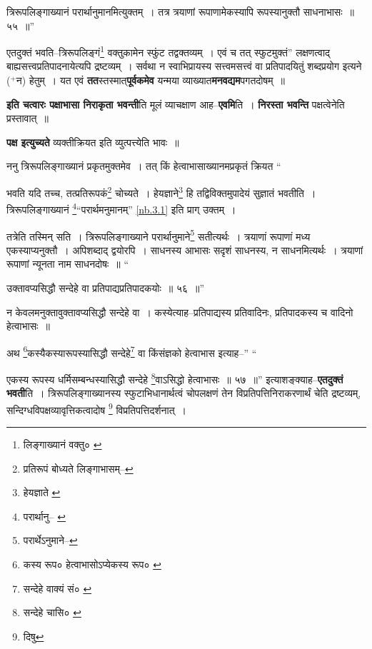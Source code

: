 \documentclass[article,12pt,a4paper]{memoir}
\newcommand{\add}[1]{($^{+}$#1)}
\begin{document}
	त्रिरूपलिङ्गाख्यानं परार्थानुमानमित्युक्तम् । तत्र त्रयाणां रूपाणामेकस्यापि रूपस्यानुक्तौ साधनाभासः ॥ ५५ ॥” 
	  
	एतदुक्तं भवति--त्रिरूपलिङ्गं\footnote{लिङ्गाख्यानं वक्तु० \cite{dp-msA} \cite{dp-msB} \cite{dp-edP} \cite{dp-edH} \cite{dp-edE} \cite{dp-edN}} वक्तुकामेन स्फुंट तद्वक्तव्यम् । एवं च तत् स्फुटमुक्तं” लक्षणत्वाद् बाह्यसत्त्वप्रतिपादनायेत्यपि द्रष्टव्यम् । सर्वथा न स्वाभिप्रायस्य सत्त्वमसत्त्वं वा प्रतिपादयितुं शब्दप्रयोग इत्यने \add{न} हेतुम् । यत एवं \textbf{तत}स्तस्मात्\textbf{पूर्वकमेव} यन्मया व्याख्यात\textbf{मनवद्यम}पगतदोषम् ॥
	\pend
      

	  \pstart \textbf{इति चत्वारः पक्षाभासा निराकृता भवन्ती}ति मूलं व्याचक्षाण आह--\textbf{एवमि}ति । \textbf{निरस्ता भवन्ति} पक्षत्वेनेति प्रस्तावात् ॥
	\pend
      

	  \pstart \textbf{पक्ष इत्युच्यते} व्यक्तीक्रियत इति व्युत्पत्त्येति भावः ॥
	\pend
      

	  \pstart ननु त्रिरूपलिङ्गाख्यानं प्रकृतमुक्तमेव । तत् किं हेत्वाभासाख्यानमप्रकृतं क्रियत  \leavevmode{} “
	  
	भवति यदि तच्च, तत्प्रतिरूपकं\footnote{प्रतिरूपं बोध्यते \cite{dp-msA} \cite{dp-msB} \cite{dp-edP} \cite{dp-edH} लिङ्गाभासम्--\cite{dp-msD-n}} चोच्यते । हेयज्ञाने\footnote{हेयज्ञाते \cite{dp-edE}} हि तद्विविक्तमुपादेयं सुज्ञातं भवतीति । त्रिरूपलिङ्गाख्यानं \footnote{परार्थानु--\cite{dp-msA} \cite{dp-msB} \cite{dp-edP} \cite{dp-edH} \cite{dp-edE} \cite{dp-edN}}“परार्थमनुमानम्” \cref{nb.3.1} इति प्राग् उक्तम् । 
	  
	तत्रेति तस्मिन् सति । त्रिरूपलिङ्गाख्याने परार्थानुमाने\footnote{परार्थेऽनुमाने--\cite{dp-msC}} सतीत्यर्थः । त्रयाणां रूपाणां मध्य एकस्याप्यनुक्तौ । अपिशब्दाद् द्वयोरपि । साधनस्य आभासः सदृशं साधनस्य, न साधनमित्यर्थः । त्रयाणां रूपाणां न्यूनता नाम साधनदोषः ॥ “
	  
	उक्तावप्यसिद्धौ सन्देहे वा प्रतिपाद्यप्रतिपादकयोः ॥ ५६ ॥” 
	  
	न केवलमनुक्तावुक्तावप्यसिद्धौ सन्देहे वा । कस्येत्याह--प्रतिपाद्यस्य प्रतिवादिनः, प्रतिपादकस्य च वादिनो हेत्वाभासः ॥ 
	  
	अथ \footnote{कस्य रूप० \cite{dp-msA} \cite{dp-edP} \cite{dp-edH} \cite{dp-edE} \cite{dp-edN} हेत्वाभासोऽप्येकस्य रूप० \cite{dp-msC}}\-कस्यैकस्यारूपस्यासिद्धौ सन्देहे\footnote{सन्देहे वाक्यं सं० \cite{dp-msA}} वा किंसंज्ञको हेत्वाभास इत्याह--” “
	  
	एकस्य रूपस्य धर्मिसम्बन्धस्यासिद्धौ सन्देहे \footnote{सन्देहे चासि० \cite{dp-msB} \cite{dp-msC} \cite{dp-msD} \cite{dp-edP} \cite{dp-edH} \cite{dp-edE}}\-वाऽसिद्धो हेत्वाभासः ॥ ५७ ॥” इत्याशङ्क्याह--\textbf{एतदुक्तं भवती}ति । त्रिरूपलिङ्गाख्यानस्य स्फुटाभिधानार्थत्वं चोपलक्षणं तेन विप्रतिपत्तिनिराकरणार्थं चेति द्रष्टव्यम्, सन्दिग्धविपक्षव्यावृत्तिकत्वादोष \footnote{दिषु} विप्रतिपत्तिदर्शनात् ।
	\pend
      
\end{document}
